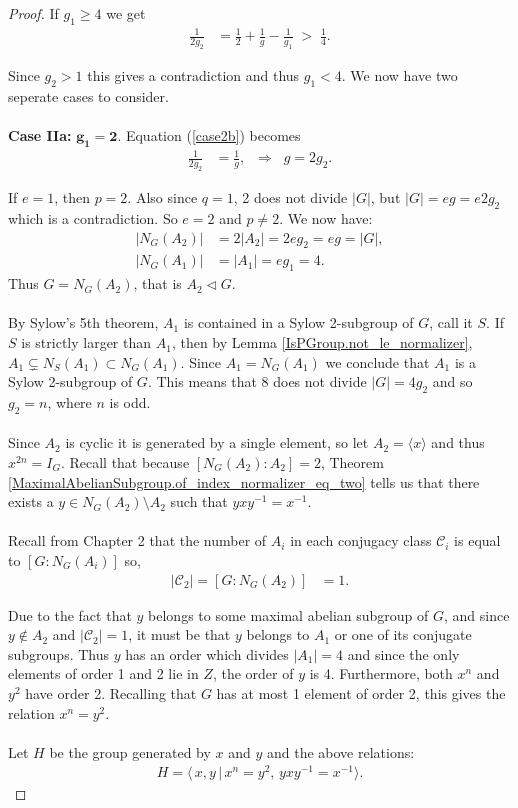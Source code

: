 \begin{proof}
If $g_1 \geq 4$ we get
\begin{align*} \frac{1}{2g_2} &= \frac{1}{2} + \frac{1}{g} - \frac{1}{g_1} \; > \; \frac{1}{4}.
\end{align*}

Since $g_2 > 1$  this gives a contradiction and thus $g_1 < 4$. We now have two seperate cases to consider.\\
\\
 \space \textbf{Case IIa:} $\pmb{g_1 = 2}$. Equation (\ref{case2b}) becomes
\begin{align*} \frac{1}{2g_2} &= \frac{1}{g}, \; \; \Longrightarrow \; \; g = 2g_2.
\end{align*}

If $e=1$, then $p=2$. Also since $q=1$, 2 does not divide $|G|$, but $|G| = eg = e2g_2$ which is a contradiction. So $e=2$ and $p \neq 2$. We now have:
\begin{align*} |N_G(A_2)| &= 2|A_2|  = 2eg_2 = eg = |G|,  \tag{since $s+t = 2$}
\\ |N_G(A_1)| &= |A_1| = eg_1 = 4. \tag{since $s=1$} 
\end{align*}
Thus $G = N_G(A_2)$, that is $A_2 \vartriangleleft G$.\\
\\
By Sylow's 5th theorem, $A_1$ is contained in a Sylow 2-subgroup of $G$, call it $S$. If $S$ is strictly larger than $A_1$, then by Lemma \ref{IsPGroup.not_le_normalizer}, $A_1 \subsetneq N_S(A_1) \subset N_G(A_1)$. Since $A_1 = N_G(A_1)$ we conclude that $A_1$ is a Sylow 2-subgroup of $G$. This means that 8 does not divide $|G| = 4g_2$ and so $g_2 = n$, where $n$ is odd. \\
\\
Since $A_2$ is cyclic it is generated by a single element, so let $A_2 = \langle x \rangle$ and thus $x^{2n}= I_G$.  Recall that because $[N_G(A_2): A_2] = 2$, Theorem \ref{MaximalAbelianSubgroup.of_index_normalizer_eq_two} tells us that there exists a $y \in N_G(A_2) \! \setminus \! A_2$ such that $yxy^{-1} = x^{-1}$. \\
\\
Recall from Chapter 2 that the number of $A_i$ in each conjugacy class $\mathcal{C}_i$ is equal to $[G : N_G(A_i)]$ so,
\begin{align*}  |\mathcal{C}_2| = [G:N_G(A_2)] &= 1.
\end{align*}

Due to the fact that $y$ belongs to some maximal abelian subgroup of $G$, and since $y \not \in A_2$ and $|\mathcal{C}_2| = 1$, it must be that $y$ belongs to $A_1$ or one of its conjugate subgroups. Thus $y$ has an order which divides $|A_1| = 4$ and since the only elements of order 1 and 2 lie in $Z$, the order of $y$ is 4. Furthermore, both $x^n$ and $y^2$ have order 2. Recalling that $G$ has at most 1 element of order 2, this gives the relation $x^n = y^2$. \\ 
\\
Let $H$ be the group generated by $x$ and $y$ and the above relations:
\begin{align*} H = \langle \, x,y \, | \, x^n = y^2, \, yxy^{-1} = x^{-1} \rangle.
\end{align*}


\end{proof}
